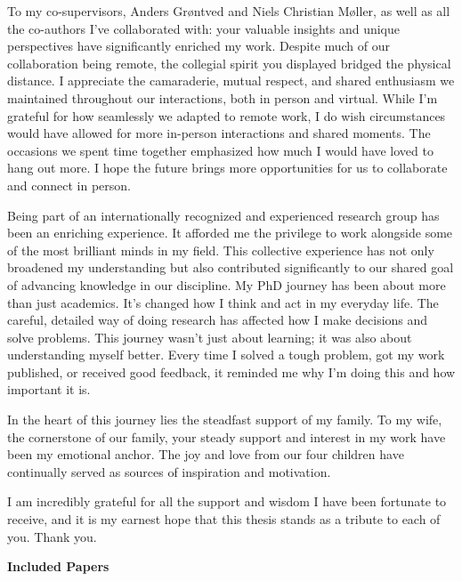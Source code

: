 To my co-supervisors, Anders Grøntved and Niels Christian Møller, as well as all the co-authors I've collaborated with: your valuable insights and unique perspectives have significantly enriched my work. Despite much of our collaboration being remote, the collegial spirit you displayed bridged the physical distance. I appreciate the camaraderie, mutual respect, and shared enthusiasm we maintained throughout our interactions, both in person and virtual. While I'm grateful for how seamlessly we adapted to remote work, I do wish circumstances would have allowed for more in-person interactions and shared moments. The occasions we spent time together emphasized how much I would have loved to hang out more. I hope the future brings more opportunities for us to collaborate and connect in person.

Being part of an internationally recognized and experienced research group has been an enriching experience. It afforded me the privilege to work alongside some of the most brilliant minds in my field. This collective experience has not only broadened my understanding but also contributed significantly to our shared goal of advancing knowledge in our discipline.
My PhD journey has been about more than just academics. It's changed how I think and act in my everyday life. The careful, detailed way of doing research has affected how I make decisions and solve problems. This journey wasn't just about learning; it was also about understanding myself better. Every time I solved a tough problem, got my work published, or received good feedback, it reminded me why I'm doing this and how important it is.

In the heart of this journey lies the steadfast support of my family. To my wife, the cornerstone of our family, your steady support and interest in my work have been my emotional anchor. The joy and love from our four children have continually served as sources of inspiration and motivation.

I am incredibly grateful for all the support and wisdom I have been fortunate to receive, and it is my earnest hope that this thesis stands as a tribute to each of you. Thank you.

\newpage

\textcolor{color1}{\textsf{\textbf{\Large{Included Papers}}}}

\vspace{2cm}

